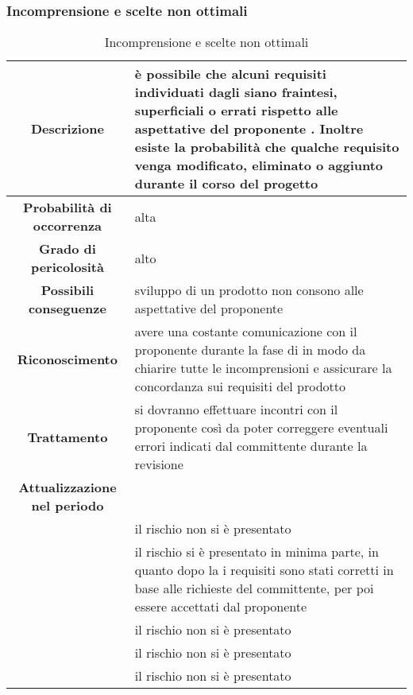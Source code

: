 \documentclass[PianoDiProgetto.tex]{subfiles}
\begin{document}
		\subsubsection{Incomprensione e scelte non ottimali}
			\label{sec:lr}
\begin{table}[h]
		\begin{center}
			\begin{tabular}{ | c | p{10cm} |}
				\hline


		 \textbf{Descrizione} & è possibile che alcuni requisiti individuati dagli \ANP{} siano fraintesi, superficiali o errati rispetto alle aspettative del proponente \PROPONENTE{}. Inoltre esiste la probabilità che qualche requisito venga modificato, eliminato o aggiunto durante il corso del progetto \\ \hline
		 \textbf{Probabilità di occorrenza} & alta \\ \hline
		 \textbf{Grado di pericolosità} & alto \\ \hline
		 \textbf{Possibili conseguenze} & sviluppo di un prodotto non consono alle aspettative del proponente \\ \hline
		 \textbf{Riconoscimento} & avere una costante comunicazione con il proponente \PROPONENTE{} durante la fase di \ARdoc{} in modo da chiarire tutte le incomprensioni e assicurare la concordanza sui requisiti del prodotto \\ \hline
		 \textbf{Trattamento} & si dovranno effettuare incontri con il proponente \PROPONENTE{} così da poter correggere eventuali errori indicati dal committente durante la revisione \\ \hline
		 \textbf{Attualizzazione nel periodo}&

				\\ \hline \textbf{\PerAR} & il rischio non si è presentato
				\\ \hline \textbf{\PerAD}& il rischio si è presentato in minima parte, in quanto dopo la  \RR{} i requisiti sono stati corretti in base alle richieste del committente, per poi essere accettati dal proponente
				\\ \hline \textbf{\PerPA}& il rischio non si è presentato
				\\ \hline \textbf{\PerPD}& il rischio non si è presentato
				\\ \hline \textbf{\PerC}& il rischio non si è presentato \\ \hline

\end{tabular}
		\caption{Incomprensione e scelte non ottimali}
		\end{center}
	\end{table}
\end{document}
